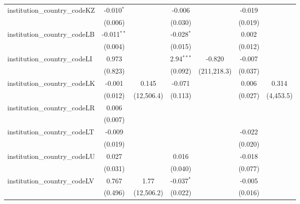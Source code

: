 \begin{tabular}{lcccccc}
   institution\_country\_codeKZ          & -0.010$^{*}$   &               & -0.006        &               & -0.019        &   \\   
                                         & (0.006)        &               & (0.030)       &               & (0.019)       &   \\   
   institution\_country\_codeLB          & -0.011$^{**}$  &               & -0.028$^{*}$  &               & 0.002         &   \\   
                                         & (0.004)        &               & (0.015)       &               & (0.012)       &   \\   
   institution\_country\_codeLI          & 0.973          &               & 2.94$^{***}$  & -0.820        & -0.007        &   \\   
                                         & (0.823)        &               & (0.092)       & (211,218.3)   & (0.037)       &   \\   
   institution\_country\_codeLK          & -0.001         & 0.145         & -0.071        &               & 0.006         & 0.314\\   
                                         & (0.012)        & (12,506.4)    & (0.113)       &               & (0.027)       & (4,453.5)\\   
   institution\_country\_codeLR          & 0.006          &               &               &               &               &   \\   
                                         & (0.007)        &               &               &               &               &   \\   
   institution\_country\_codeLT          & -0.009         &               &               &               & -0.022        &   \\   
                                         & (0.019)        &               &               &               & (0.020)       &   \\   
   institution\_country\_codeLU          & 0.027          &               & 0.016         &               & -0.018        &   \\   
                                         & (0.031)        &               & (0.040)       &               & (0.077)       &   \\   
   institution\_country\_codeLV          & 0.767          & 1.77          & -0.037$^{*}$  &               & -0.005        &   \\   
                                         & (0.496)        & (12,506.2)    & (0.022)       &               & (0.016)       &   \\   

\end{tabular}
